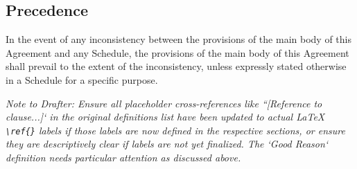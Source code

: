 \subsection{Precedence}
In the event of any inconsistency between the provisions of the main body of this Agreement and any Schedule, the provisions of the main body of this Agreement shall prevail to the extent of the inconsistency, unless expressly stated otherwise in a Schedule for a specific purpose.

\textit{Note to Drafter: Ensure all placeholder cross-references like ``[Reference to clause...]` in the original definitions list have been updated to actual LaTeX \texttt{\textbackslash ref\{\}} labels if those labels are now defined in the respective sections, or ensure they are descriptively clear if labels are not yet finalized. The `Good Reason` definition needs particular attention as discussed above.} 